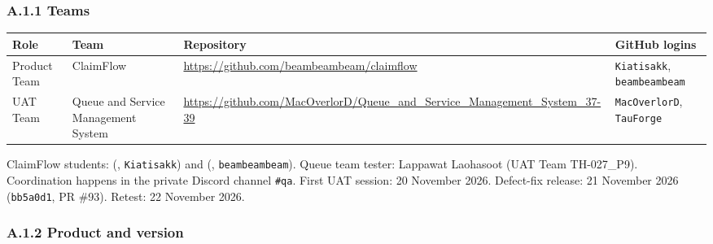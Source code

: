 
\subsubsection*{A.1.1 Teams}

{\def\LTcaptype{none} %
\begin{longtable}[]{@{}
  >{\raggedright\arraybackslash}p{}
  >{\raggedright\arraybackslash}p{}
  >{\raggedright\arraybackslash}p{}
  >{\raggedright\arraybackslash}p{}@{}}
\toprule\noalign{}
\begin{minipage}[b]{\linewidth}\raggedright
Role
\end{minipage} & \begin{minipage}[b]{\linewidth}\raggedright
Team
\end{minipage} & \begin{minipage}[b]{\linewidth}\raggedright
Repository
\end{minipage} & \begin{minipage}[b]{\linewidth}\raggedright
GitHub logins
\end{minipage} \\
\midrule\noalign{}
\endhead
\bottomrule\noalign{}
\endlastfoot
Product Team & ClaimFlow & \url{https://github.com/beambeambeam/claimflow} & \texttt{Kiatisakk}, \texttt{beambeambeam} \\
UAT Team & Queue and Service Management System & \url{https://github.com/MacOverlorD/Queue_and_Service_Management_System_37-39} & \texttt{MacOverlorD}, \texttt{TauForge} \\
\end{longtable}
}

ClaimFlow students: \studentOneName{} (\studentOneId, \texttt{Kiatisakk}) and \studentTwoName{} (\studentTwoId, \texttt{beambeambeam}). Queue team tester: Lappawat Laohasoot (UAT Team TH-027\_P9). Coordination happens in the private Discord channel \texttt{\#qa}. First UAT session: 20 November 2026. Defect-fix release: 21 November 2026 (\texttt{bb5a0d1}, PR \#93). Retest: 22 November 2026.

\subsubsection*{A.1.2 Product and version}

